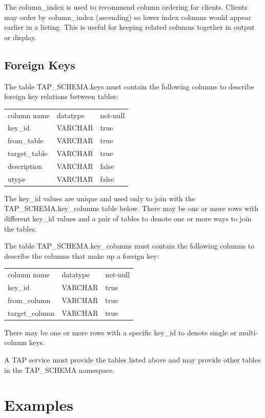 \documentclass[11pt,letter]{ivoa}
\begin{document}
The column\_index is used to recommend column ordering for clients. Clients 
may order by column\_index (ascending) so lower index columns would appear 
earlier in a listing. This is useful for keeping related columns together in 
output or display.

\subsection{Foreign Keys}
\label{sec:tap-schema-keys}
The table TAP\_SCHEMA.keys must contain the following columns to 
describe foreign key relations between tables:

\begin{tabular}{l l l}
\label{tab:tap-schema-keys}
column name & datatype & not-null \\
key\_id & VARCHAR & true \\
from\_table & VARCHAR & true \\
target\_table & VARCHAR & true \\
description & VARCHAR & false \\
utype & VARCHAR & false \\
\end{tabular}

The key\_id values are unique and used only to join with the 
TAP\_SCHEMA.key\_columns table below. There may be 
one or more rows with different key\_id values and a pair 
of tables to denote one or more ways to join the tables.

The table TAP\_SCHEMA.key\_columns must contain the 
following columns to describe the columns that make up a foreign key:

\begin{tabular}{l l l}
\label{tab:tap-schema-key-columns}
column name & datatype & not-null \\
key\_id & VARCHAR & true \\
from\_column & VARCHAR & true \\
target\_column & VARCHAR & true \\
\end{tabular}

There may be one or more rows with a specific key\_id to 
denote single or multi-column keys.

A TAP service must provide the tables listed above and may provide other tables 
in the TAP\_SCHEMA namespace.


\section{Examples}
\label{sec:examples}
\end{document}
